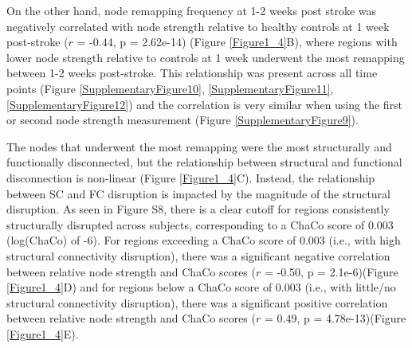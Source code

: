 \documentclass[phd,tocprelim]{cornell}
\begin{document}
	On the other hand, node remapping frequency at 1-2 weeks post stroke was negatively correlated with node strength relative to healthy controls at 1 week post-stroke ($r$  = -0.44, p = 2.62e-14) (Figure \ref{Figure1_4}B), where regions with lower node strength relative to controls at 1 week underwent the most remapping between 1-2 weeks post-stroke. This relationship was present across all time points (Figure \ref{SupplementaryFigure10}, \ref{SupplementaryFigure11}, \ref{SupplementaryFigure12}) and the correlation is very similar when using the first or second node strength measurement (Figure \ref{SupplementaryFigure9}).
	
	The nodes that underwent the most remapping were the most structurally and functionally disconnected, but the relationship between structural and functional disconnection is non-linear (Figure \ref{Figure1_4}C). Instead, the relationship between SC and FC disruption is impacted by the magnitude of the structural disruption. As seen in Figure S8, there is a clear cutoff for regions consistently structurally disrupted across subjects, corresponding to a ChaCo score of 0.003 (log(ChaCo) of -6). For regions exceeding a ChaCo score of 0.003 (i.e., with high structural connectivity disruption), there was a significant negative correlation between relative node strength and ChaCo scores ($r$  = -0.50, p = 2.1e-6)(Figure \ref{Figure1_4}D) and for regions below a ChaCo score of 0.003 (i.e., with little/no structural connectivity disruption), there was a significant positive correlation between relative node strength and ChaCo scores ($r$  = 0.49, p = 4.78e-13)(Figure \ref{Figure1_4}E). 



    
\end{document}
